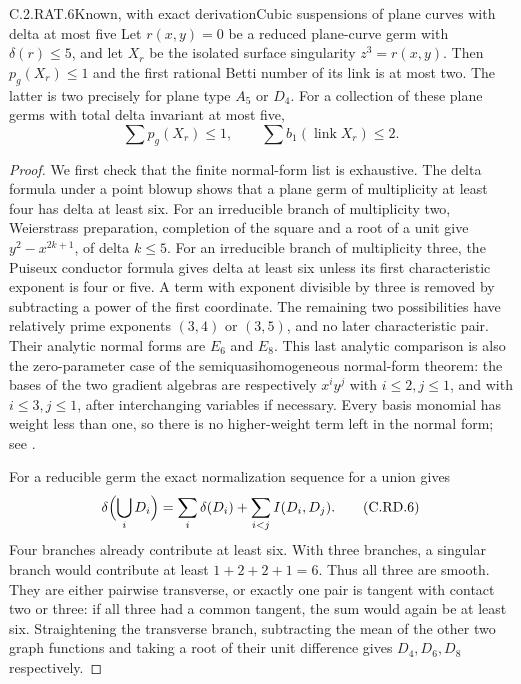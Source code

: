 \begin{statement}{C.2.RAT.6}{Known, with exact derivation}{Cubic suspensions of plane curves with delta at most five}
Let $r(x,y)=0$ be a reduced plane-curve germ with
$\delta(r)\le5$, and let $X_r$ be the isolated surface
singularity $z^3=r(x,y)$. Then $p_g(X_r)\le1$ and the
first rational Betti number of its link is at most two.
The latter is two precisely for plane type $A_5$ or $D_4$.
For a collection of these plane germs with total delta
invariant at most five,
\[
             \sum p_g(X_r)\le1,
           \qquad \sum b_1(\operatorname{link}X_r)\le2.
\tag{C.RD.5}
\]
\end{statement}
\begin{proof}
We first check that the finite normal-form list is exhaustive.
The delta formula under a point blowup shows that a plane
germ of multiplicity at least four has delta at least six.
For an irreducible branch of multiplicity two,
Weierstrass preparation, completion of the square and a
root of a unit give $y^2-x^{2k+1}$, of delta $k\le5$.
For an irreducible branch of multiplicity three, the
Puiseux conductor formula gives delta at least six
unless its first characteristic exponent is four or
five. A term with exponent divisible by three is removed
by subtracting a power of the first coordinate. The
remaining two possibilities have relatively prime
exponents $(3,4)$ or $(3,5)$, and no later characteristic
pair. Their analytic normal forms are $E_6$ and $E_8$.
This last analytic comparison is also the zero-parameter
case of the semiquasihomogeneous normal-form theorem:
the bases of the two gradient algebras are respectively
$x^i y^j$ with $i\le2,j\le1$, and with
$i\le3,j\le1$, after interchanging variables if necessary.
Every basis monomial has weight less than one, so there
is no higher-weight term left in the normal form; see
\cite[\S1, I.1.0, and \S2]{Arnold1976NormalForms}.

For a reducible germ the exact normalization sequence
for a union gives
\[
 \delta\Bigl(\bigcup_i D_i\Bigr)
       =\sum_i\delta(D_i)+\sum_{i<j}I(D_i,D_j).
\tag{C.RD.6}
\]
Four branches already contribute at least six.
With three branches, a singular branch would contribute
at least $1+2+2+1=6$. Thus all three are smooth.
They are either pairwise transverse, or exactly one
pair is tangent with contact two or three: if all
three had a common tangent, the sum would again be
at least six. Straightening the transverse branch,
subtracting the mean of the other two graph functions
and taking a root of their unit difference gives
$D_4,D_6,D_8$ respectively.


\end{proof}
